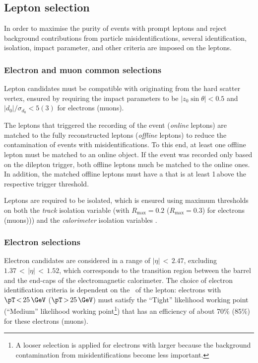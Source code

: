 \subsection{Lepton selection}
In order to maximise the purity of events with prompt leptons and reject background contributions from particle misidentifications, several identification, isolation, impact parameter, and other criteria are imposed on the leptons.

\subsubsection{Electron and muon common selections}
Lepton candidates must be compatible with originating from the hard scatter vertex, ensured by requiring the impact parameters to be $|z_0\sin\theta|<0.5$ and $|d_0| / \sigma_{d_0} < 5 (3)$ for electrons (muons). 

The leptons that triggered the recording of the event (\emph{online} leptons) are matched to the fully reconstructed leptons (\emph{offline} leptons) to reduce the contamination of events with misidentifications.
To this end, at least one offline lepton must be matched to an online object.
If the event was recorded only based on the dilepton trigger, both offline leptons much be matched to the online ones. 
In addition, the matched offline leptons must have a \pT that is at least 1\,\GeV above the respective trigger threshold.

Leptons are required to be isolated, which is ensured using maximum thresholds on both the \emph{track} isolation variable \pTvarcone (with $R_{\text{max}} = 0.2$ ($R_{\text{max}} = 0.3$) for electrons (muons))) and the \emph{calorimeter} isolation variables \ETconetwenty. 

\subsubsection{Electron selections}
Electron candidates are considered in a range of $|\eta| \,{<}\, 2.47$, excluding $1.37\,{<}\,|\eta|\,{<}\,1.52$, which corresponds to the transition region between the barrel and the end-caps of the electromagnetic calorimeter. 
The choice of electron identification criteria is dependent on the \pT\ of the lepton: electrons with $\pT \,{<}\,25\,\GeV$ ($\pT\,{>}\,25\,\GeV$) must satisfy the ``Tight'' likelihood working point (``Medium'' likelihood working point\footnote{A looser selection is applied for electrons with larger \pT because the background contamination from misidentifications become less important.}) that has an efficiency of about 70\% (85\%) for these electrons (muons).~\cite{EGAM-2018-01} 

